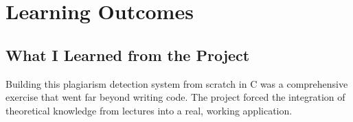 \documentclass[12pt,a4paper]{article}
\begin{document}
\newpage


\section{Learning Outcomes}

\subsection{What I Learned from the Project}

Building this plagiarism detection system from scratch in C was a comprehensive exercise that went far beyond writing code. The project forced the integration of theoretical knowledge from lectures into a real, working application.
\end{document}
